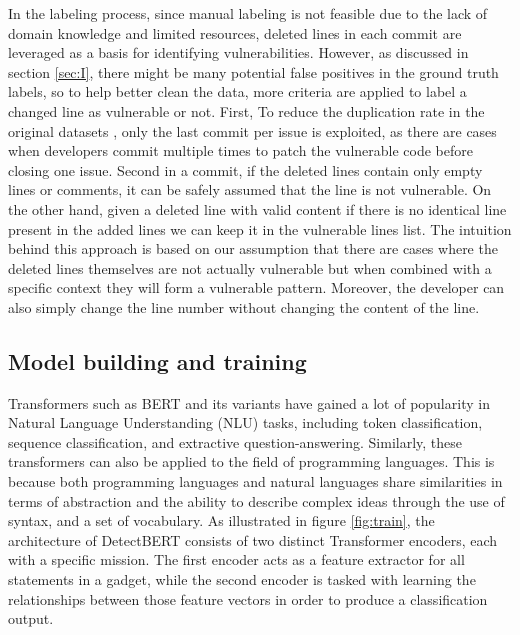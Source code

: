 \documentclass{ieeeaccess}
\begin{document}
\par  In the labeling process, since manual labeling is not feasible due to the lack of domain knowledge and limited resources,  deleted lines in each commit are leveraged as a basis for identifying vulnerabilities. However, as discussed in section \ref{sec:I}, there might be many potential false positives in the ground truth labels, so to help better clean the data,  more criteria are applied to label a changed line as vulnerable or not. First, To reduce the duplication rate in the original datasets \cite{VUDENC},  only the last commit per issue is exploited, as there are cases when developers commit multiple times to patch the vulnerable code before closing one issue. Second in a commit, if the deleted lines contain only empty lines or comments, it can be safely assumed that the line is not vulnerable. On the other hand, given a deleted line with valid content if there is no identical line present in the added lines we can keep it in the vulnerable lines list. The intuition behind this approach is based on our assumption that there are cases where the deleted lines themselves are not actually vulnerable but when combined with a specific context they will form a vulnerable pattern. Moreover, the developer can also simply change the line number without changing the content of the line.
\subsection{Model building and training}\label{sec:ME}

\par Transformers such as BERT\cite{bert} and its variants\cite{distilbert,albert, longformer, xlnet} have gained a lot of popularity in Natural Language Understanding (NLU) tasks, including token classification, sequence classification, and extractive question-answering. Similarly, these transformers can also be applied to the field of programming languages. This is because both programming languages and natural languages share similarities in terms of abstraction and the ability to describe complex ideas through the use of syntax, and a set of vocabulary. As illustrated in figure \ref{fig:train}, the architecture of DetectBERT consists of two distinct Transformer encoders, each with a specific mission. The first encoder acts as a feature extractor  for all statements in a gadget, while the second encoder is tasked with learning the relationships between those feature vectors in order to produce a classification output.
\end{document}
